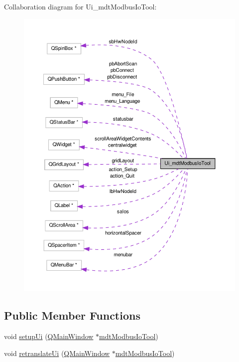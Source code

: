 Collaboration diagram for Ui\-\_\-mdt\-Modbus\-Io\-Tool\-:\nopagebreak
\begin{figure}[H]
\begin{center}
\leavevmode
\includegraphics[width=350pt]{class_ui__mdt_modbus_io_tool__coll__graph}
\end{center}
\end{figure}
\subsection*{Public Member Functions}
\begin{DoxyCompactItemize}
\item 
void \hyperlink{class_ui__mdt_modbus_io_tool_aeceaeaccbc3c38603c0fc35bd5fb2815}{setup\-Ui} (\hyperlink{class_q_main_window}{Q\-Main\-Window} $\ast$\hyperlink{classmdt_modbus_io_tool}{mdt\-Modbus\-Io\-Tool})
\item 
void \hyperlink{class_ui__mdt_modbus_io_tool_a5344c19fa7f91ed18bd9940dab02746b}{retranslate\-Ui} (\hyperlink{class_q_main_window}{Q\-Main\-Window} $\ast$\hyperlink{classmdt_modbus_io_tool}{mdt\-Modbus\-Io\-Tool})
\end{DoxyCompactItemize}
